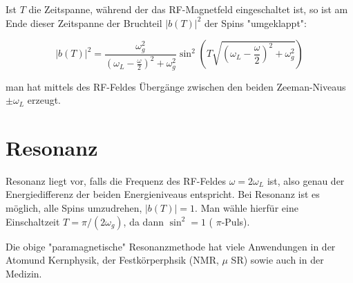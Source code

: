 \documentclass[10pt, letterpaper]{article}
\begin{document}
Ist $T$ die Zeitspanne, während der das RF-Magnetfeld eingeschaltet ist, so ist am Ende dieser Zeitspanne der Bruchteil $|b(T)|^{2}$ der Spins "umgeklappt":

$$
|b(T)|^{2}=\frac{\omega_{g}^{2}}{\left(\omega_{L}-\frac{\omega}{2}\right)^{2}+\omega_{g}^{2}} \sin ^{2}\left(T \sqrt{\left(\omega_{L}-\frac{\omega}{2}\right)^{2}+\omega_{g}^{2}}\right)
$$

man hat mittels des RF-Feldes Übergänge zwischen den beiden Zeeman-Niveaus $\pm \omega_{L}$ erzeugt.

\section*{Resonanz}
Resonanz liegt vor, falls die Frequenz des RF-Feldes $\omega=2 \omega_{L}$ ist, also genau der Energiedifferenz der beiden Energieniveaus entspricht. Bei Resonanz ist es möglich, alle Spins umzudrehen, $|b(T)|=1$. Man wähle hierfür eine Einschaltzeit $T=\pi /\left(2 \omega_{g}\right)$, da dann $\sin ^{2}=1$ ( $\pi$-Puls).

Die obige "paramagnetische" Resonanzmethode hat viele Anwendungen in der Atomund Kernphysik, der Festkörperphsik (NMR, $\mu$ SR) sowie auch in der Medizin.
\end{document}
